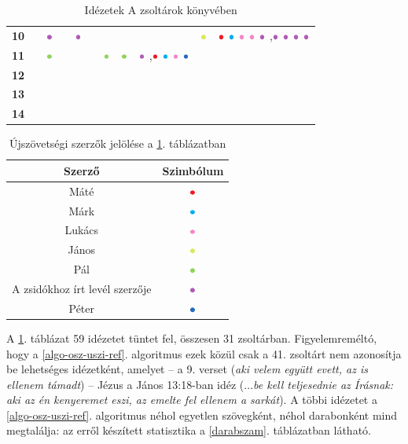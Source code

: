 \documentclass{article}
\newcommand\Luke{{\color{Lavender}\bullet}\mathllap{\color{Lavender}\circ}}
\newcommand\Paul{{\color{YellowGreen}\bullet}\mathllap{\color{YellowGreen}\circ}}
\newcommand\Unknown{{\color{Orchid}\bullet}\mathllap{\color{Orchid}\circ}}
\newcommand\Matthew{{\color{Red}\bullet}\mathllap{\color{Red}\circ}}
\newcommand\Mark{{\color{Cyan}\bullet}\mathllap{\color{Cyan}\circ}}
\newcommand\John{{\color{GreenYellow}\bullet}\mathllap{\color{GreenYellow}\circ}}
\newcommand\Peter{{\color{NavyBlue}\bullet}\mathllap{\color{NavyBlue}\circ}}
\begin{document}
\begin{table}
\begin{tabular}{r|cccccccccc}
{\bf 10}&&
$\Unknown$%
&&
$\Unknown$%
&&&&&
$\John$%
&
$\Matthew$%
$\Mark$%
$\Luke$%
$\Luke$%
$\Unknown$%
,$\Unknown$%
$\Unknown$%
$\Unknown$%
$\Unknown$%
\\
{\bf 11}&&
$\Paul$%
&&&&
$\Paul$%
&
$\Paul$%
&
$\Unknown$%
,$\Matthew$%
$\Mark$%
$\Luke$%
$\Peter$%
&&\\
{\bf 12}&&&&&&&&&&\\
{\bf 13}&&&&&&&&&&\\
{\bf 14}&&&&&&&&&&\\
\end{tabular}
\caption{Idézetek A zsoltárok könyvében}
\label{hagyomanyos-idezetek}
\end{table}

\begin{table}
\centering
\begin{tabular}{cc}
\textbf{Szerző}&\textbf{Szimbólum}\\
\hline
Máté&$\Matthew$\\
Márk&$\Mark$\\
Lukács&$\Luke$\\
János&$\John$\\
Pál&$\Paul$\\
A zsidókhoz írt levél szerzője&$\Unknown$\\
Péter&$\Peter$
\end{tabular}
\caption{Újszövetségi szerzők jelölése a \ref{hagyomanyos-idezetek}. táblázatban}
\label{szerzok}
\end{table}

A \ref{hagyomanyos-idezetek}. táblázat 59 idézetet tüntet fel, összesen 31 zsoltárban. Figyelemreméltó,
hogy a \ref{algo-osz-uszi-ref}. algoritmus ezek közül csak a 41. zsoltárt nem azonosítja be lehetséges
idézetként, amelyet -- a 9. verset (\textit{aki velem együtt evett, az is ellenem támadt}) --
Jézus a János 13:18-ban idéz (\textit{$\ldots$be kell teljesednie az Írásnak:
aki az én kenyeremet eszi, az emelte fel ellenem a sarkát}). A többi idézetet a
\ref{algo-osz-uszi-ref}. algoritmus néhol egyetlen szövegként, néhol darabonként
mind megtalálja: az erről készített statisztika a \ref{darabszam}. táblázatban látható.
\end{document}
